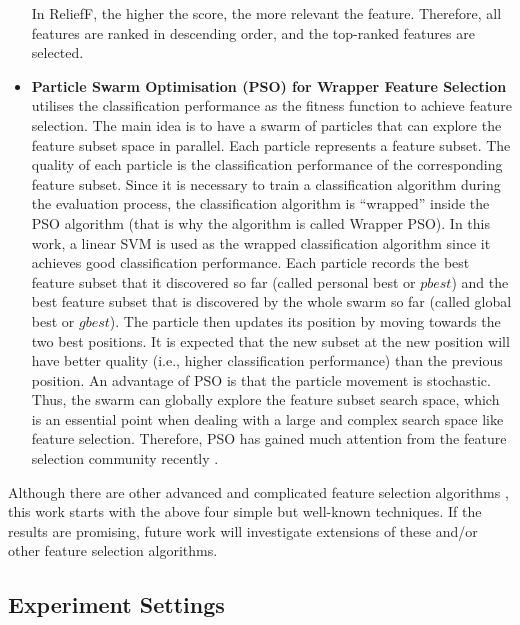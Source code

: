 \documentclass[runningheads]{llncs}
\begin{document}
\begin{itemize}
	In ReliefF, the higher the score, the more relevant the feature. Therefore, all features are ranked in descending order, and the top-ranked features are selected. 
	\item \textbf{Particle Swarm Optimisation (PSO) \cite{kennedy1995particle,7969325} for Wrapper Feature Selection} utilises the classification performance as the fitness function to achieve feature selection. 
	The main idea is to have a swarm of particles that can explore the feature subset space in parallel. 
	Each particle represents a feature subset. 
	The quality of each particle is the classification performance of the corresponding feature subset. 
	Since it is necessary to train a classification algorithm during the evaluation process, the classification algorithm is ``wrapped'' inside the PSO algorithm (that is why the algorithm is called Wrapper PSO). 
	In this work, a linear SVM is used as the wrapped classification algorithm since it achieves good classification performance. 
	Each particle records the best feature subset that it discovered so far (called personal best or $pbest$) and the best feature subset that is discovered by the whole swarm so far (called global best or $gbest$). 
	The particle then updates its position by moving towards the two best positions. 
	It is expected that the new subset at the new position will have better quality (i.e., higher classification performance) than the previous position. 
	An advantage of PSO is that the particle movement is stochastic. 
	Thus, the swarm can globally explore the feature subset search space, which is an essential point when dealing with a large and complex search space like feature selection. 
	Therefore, PSO has gained much attention from the feature selection community recently \cite{nguyen2020survey}.
\end{itemize}

Although there are other advanced and complicated feature selection algorithms \cite{li2017feature,zhang2020binary,alsahaf2022framework,alweshah2022coronavirus}, this work starts with the above four simple but well-known techniques. 
If the results are promising, future work will investigate extensions of these and/or other feature selection algorithms. 

\subsection{Experiment Settings}
\end{document}
